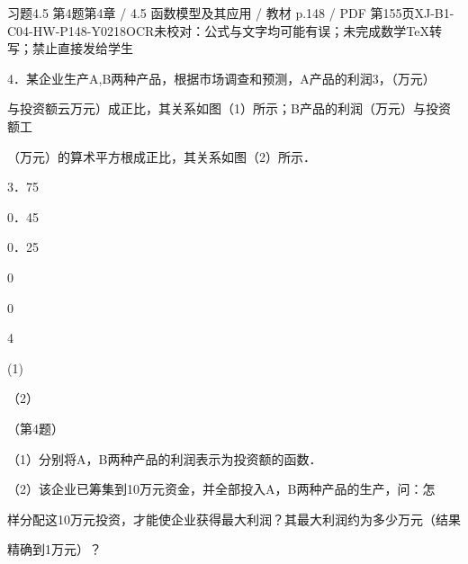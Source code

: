 \begin{bankitem}{习题4.5 第4题}{第4章 / 4.5 函数模型及其应用 / 教材 p.148 / PDF 第155页}{XJ-B1-C04-HW-P148-Y0218}{OCR未校对：公式与文字均可能有误；未完成数学TeX转写；禁止直接发给学生}
\begin{ocrdraft}
\par
4．某企业生产A,B两种产品，根据市场调查和预测，A产品的利润3，（万元）
\par
与投资额云万元）成正比，其关系如图（1）所示；B产品的利润（万元）与投资额工
\par
（万元）的算术平方根成正比，其关系如图（2）所示．
\par
3．75
\par
0．45
\par
0．25
\par
0
\par
0
\par
4
\par
(1)
\par
（2）
\par
（第4题）
\par
（1）分别将A，B两种产品的利润表示为投资额的函数．
\par
（2）该企业已筹集到10万元资金，并全部投入A，B两种产品的生产，问：怎
\par
样分配这10万元投资，才能使企业获得最大利润？其最大利润约为多少万元（结果
\par
精确到1万元）？
\end{ocrdraft}
\end{bankitem}
